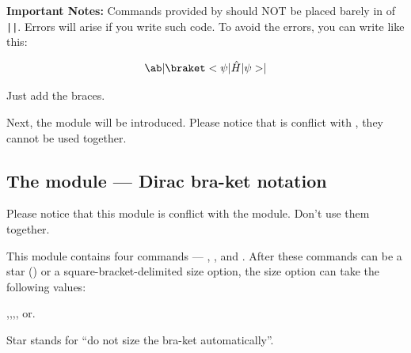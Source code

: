 \documentclass[11pt,letterpaper]{article}
\begin{document}
\pardanger
\textbf{Important Notes:} Commands provided by  should NOT
be placed barely in  of \texttt|\texttt|.
Errors will arise if you write such code. To avoid the errors, you can write
like this:
\begin{example}
\[
  \ab| { \braket<\psi|\hat H|\psi> } |
\]
\end{example}
Just add the braces.

Next, the  module will be introduced. Please notice that
 is conflict with , they cannot be used together.

\subsection{The  module --- Dirac bra-ket notation}
\begingroup
\makeatletter{}%
\def\PackageWarning#1#2{}%
\makeatother
Please notice that this module is conflict with the  module.
Don't use them together.

This module contains four commands --- , ,  and
. After these commands can be a star (\opt{*}) or a
square-bracket-delimited size option, the size option can
take the following values:
\begin{center}
,\quad{},\quad{},\quad{},\quad
{}\quad or\quad{}.
\end{center}
Star stands for ``do not size the bra-ket automatically''.
\end{document}
